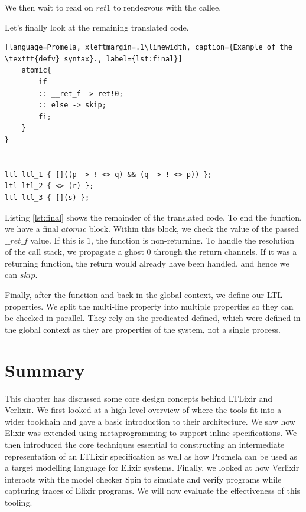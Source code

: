 \par
We then wait to read on $ret1$ to rendezvous with the callee.
\par
Let's finally look at the remaining translated code.
\begin{lstlisting}[language=Promela, xleftmargin=.1\linewidth, caption={Example of the \texttt{defv} syntax}., label={lst:final}]
    atomic{
        if
        :: __ret_f -> ret!0;
        :: else -> skip;
        fi;
    }
}


ltl ltl_1 { []((p -> ! <> q) && (q -> ! <> p)) };
ltl ltl_2 { <> (r) };
ltl ltl_3 { [](s) };
\end{lstlisting}
Listing \ref{lst:final} shows the remainder of the translated code. To end the function, we have a final $atomic$ block. Within this block, we check the value of the passed $\_\_ret\_f$ value. If this is $1$, the function is non-returning. To handle the resolution of the call stack, we propagate a ghost $0$ through the return channels. If it was a returning function, the return would already have been handled, and hence we can $skip$.
\par
Finally, after the function and back in the global context, we define our LTL properties. We split the multi-line property into multiple properties so they can be checked in parallel. They rely on the predicated defined, which were defined in the global context as they are properties of the system, not a single process.
\par
\section{Summary}
This chapter has discussed some core design concepts behind LTLixir and Verlixir. We first looked at a high-level overview of where the tools fit into a wider toolchain and gave a basic introduction to their architecture. We saw how Elixir was extended using metaprogramming to support inline specifications. We then introduced the core techniques essential to constructing an intermediate representation of an LTLixir specification as well as how Promela can be used as a target modelling language for Elixir systems. Finally, we looked at how Verlixir interacts with the model checker Spin to simulate and verify programs while capturing traces of Elixir programs. We will now evaluate the effectiveness of this tooling.
